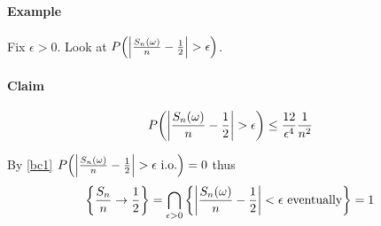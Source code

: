 \paragraph{Example}
Fix $\epsilon>0$. Look at $P\qty(\abs{\frac{S_n(\omega)}{n} -\frac{1}{2}}>\epsilon)$.

\paragraph{Claim} $$P\qty(\abs{\frac{S_n(\omega)}{n} -\frac{1}{2}}>\epsilon) \leq \frac{12}{\epsilon^4} \frac{1}{n^2}$$

By \ref{bc1} $P\qty(\abs{\frac{S_n(\omega)}{n} -\frac{1}{2}}>\epsilon \text{ i.o.}) = 0$ thus
$$\left\{ \frac{S_n}{n} \to \frac{1}{2} \right\} = \bigcap_{\epsilon>0} \left\{ \abs{\frac{S_n(\omega)}{n} -\frac{1}{2}}<\epsilon \text{ eventually}  \right\} = 1$$
		
		
